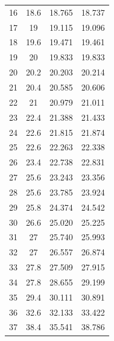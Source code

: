 \begin{table}[H]
\begin{tabular}{cccc}
    16         & 18.6                        & 18.765                & 18.737                 \\
    17         & 19                          & 19.115                & 19.096                 \\
    18         & 19.6                        & 19.471                & 19.461                 \\
    19         & 20                          & 19.833                & 19.833                 \\
    20         & 20.2                        & 20.203                & 20.214                 \\
    21         & 20.4                        & 20.585                & 20.606                 \\
    22         & 21                          & 20.979                & 21.011                 \\
    23         & 22.4                        & 21.388                & 21.433                 \\
    24         & 22.6                        & 21.815                & 21.874                 \\
    25         & 22.6                        & 22.263                & 22.338                 \\
    26         & 23.4                        & 22.738                & 22.831                 \\
    27         & 25.6                        & 23.243                & 23.356                 \\
    28         & 25.6                        & 23.785                & 23.924                 \\
    29         & 25.8                        & 24.374                & 24.542                 \\
    30         & 26.6                        & 25.020                & 25.225                 \\
    31         & 27                          & 25.740                & 25.993                 \\
    32         & 27                          & 26.557                & 26.874                 \\
    33         & 27.8                        & 27.509                & 27.915                 \\
    34         & 27.8                        & 28.655                & 29.199                 \\
    35         & 29.4                        & 30.111                & 30.891                 \\
    36         & 32.6                        & 32.133                & 33.422                 \\
    37         & 38.4                        & 35.541                & 38.786          \\
    \bottomrule      
    \end{tabular}
    \end{table}

